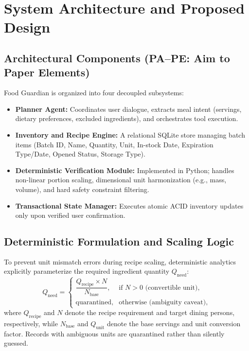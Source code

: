 \section{System Architecture and Proposed Design}

\subsection{Architectural Components (PA--PE: Aim to Paper Elements)}
Food Guardian is organized into four decoupled subsystems:
\begin{itemize}
    \item \textbf{Planner Agent:} Coordinates user dialogue, extracts meal intent (servings, dietary preferences, excluded ingredients), and orchestrates tool execution.
    \item \textbf{Inventory and Recipe Engine:} A relational SQLite store managing batch items (Batch ID, Name, Quantity, Unit, In-stock Date, Expiration Type/Date, Opened Status, Storage Type).
    \item \textbf{Deterministic Verification Module:} Implemented in Python; handles non-linear portion scaling, dimensional unit harmonization (e.g., mass, volume), and hard safety constraint filtering.
    \item \textbf{Transactional State Manager:} Executes atomic ACID inventory updates only upon verified user confirmation.
\end{itemize}

\subsection{Deterministic Formulation and Scaling Logic}
To prevent unit mismatch errors during recipe scaling, deterministic analytics explicitly parameterize the required ingredient quantity $Q_{\text{need}}$:
\begin{equation}
Q_{\text{need}} = 
\begin{cases}
\dfrac{Q_{\text{recipe}} \times N}{N_{\text{base}}}, & \text{if } N > 0 \text{ (convertible unit)}, \\[10pt]
\text{quarantined}, & \text{otherwise (ambiguity caveat)},
\end{cases}
\label{eq:portion_scaling}
\end{equation}
where $Q_{\text{recipe}}$ and $N$ denote the recipe requirement and target dining persons, respectively, while $N_{\text{base}}$ and $Q_{\text{unit}}$ denote the base servings and unit conversion factor. Records with ambiguous units are quarantined rather than silently guessed.

